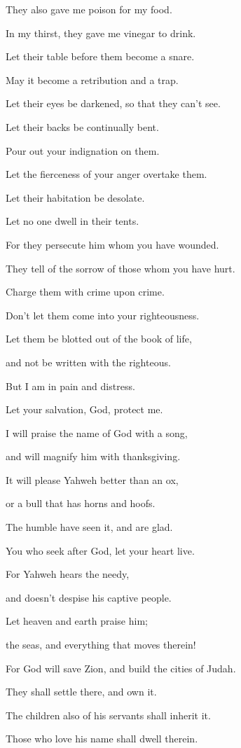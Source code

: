 {\par }{\Q {}They also gave me poison for my food.
\par }{\QB In my thirst, they gave me vinegar to drink.
\par }{\Q {}Let their table before them become a snare.
\par }{\QB May it become a retribution and a trap.
\par }{\Q {}Let their eyes be darkened, so that they can’t see.
\par }{\QB Let their backs be continually bent.
\par }{\Q {}Pour out your indignation on them.
\par }{\QB Let the fierceness of your anger overtake them.
\par }{\Q {}Let their habitation be desolate.
\par }{\QB Let no one dwell in their tents.
\par }{\Q {}For they persecute him whom you have wounded.
\par }{\QB They tell of the sorrow of those whom you have hurt.
\par }{\Q {}Charge them with crime upon crime.
\par }{\QB Don’t let them come into your righteousness.
\par }{\Q {}Let them be blotted out of the book of life,
\par }{\QB and not be written with the righteous.
\par }{\Q {}But I am in pain and distress.
\par }{\QB Let your salvation, God, protect me.
\par }{\Q {}I will praise the name of God with a song,
\par }{\QB and will magnify him with thanksgiving.
\par }{\Q {}It will please Yahweh better than an ox,
\par }{\QB or a bull that has horns and hoofs.
\par }{\Q {}The humble have seen it, and are glad.
\par }{\QB You who seek after God, let your heart live.
\par }{\Q {}For Yahweh hears the needy,
\par }{\QB and doesn’t despise his captive people.
\par }{\Q {}Let heaven and earth praise him;
\par }{\QB the seas, and everything that moves therein!
\par }{\Q {}For God will save Zion, and build the cities of Judah.
\par }{\QB They shall settle there, and own it.
\par }{\Q {}The children also of his servants shall inherit it.
\par }{\QB Those who love his name shall dwell therein.

}
